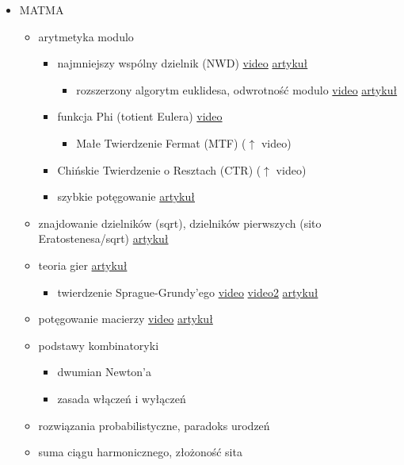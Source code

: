 \documentclass[15pt]{article}
\begin{document}
\begin{itemize}
    \item MATMA
    \begin{itemize}
        \item arytmetyka modulo
        \begin{itemize}
            \item najmniejszy wspólny dzielnik (NWD) \href{http://solve.edu.pl/~sparingi/resources}{video} \href{http://kompendium.meetit.pl/kurs#num1}{artykuł}
            \begin{itemize}
                \item rozszerzony algorytm euklidesa, odwrotność modulo \href{http://solve.edu.pl/~sparingi/resources}{video} \href{http://kompendium.meetit.pl/kurs#num2}{artykuł}
            \end{itemize}
            \item funkcja Phi (totient Eulera) \href{http://solve.edu.pl/~sparingi/resources}{video}
            \begin{itemize}
                \item Małe Twierdzenie Fermat (MTF) ($\uparrow$ video)
            \end{itemize}
            \item Chińskie Twierdzenie o Resztach (CTR) ($\uparrow$ video)
            \item szybkie potęgowanie \href{http://kompendium.meetit.pl/kurs#basic4}{artykuł}
        \end{itemize}
        \item znajdowanie dzielników (sqrt), dzielników pierwszych (sito Eratostenesa/sqrt) \href{http://kompendium.meetit.pl/kurs#num1}{artykuł}
        \item teoria gier \href{http://kompendium.meetit.pl/kurs#games1}{artykuł}
        \begin{itemize}
            \item twierdzenie Sprague-Grundy'ego \href{http://solve.edu.pl/~sparingi/resources}{video} \href{http://was.zaa.mimuw.edu.pl/?q=node/18}{video2} \href{http://kompendium.meetit.pl/kurs#games2}{artykuł}
        \end{itemize}
        \item potęgowanie macierzy \href{http://was.zaa.mimuw.edu.pl/?q=node/35}{video} \href{http://kompendium.meetit.pl/kurs#dp5}{artykuł}
        \item podstawy kombinatoryki
        \begin{itemize}
            \item dwumian Newton'a
            \item zasada włączeń i wyłączeń
        \end{itemize}
        \item rozwiązania probabilistyczne, paradoks urodzeń
        \item suma ciągu harmonicznego, złożoność sita
    \end{itemize}
    

\end{itemize}
\end{document}
